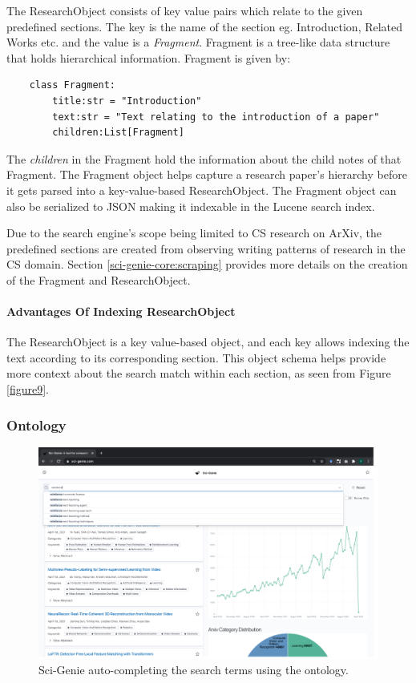 The ResearchObject consists of key value pairs which relate to the given predefined sections. The key is the name of the section eg. Introduction, Related Works etc. and the value is a \textit{Fragment}. 
Fragment is a tree-like data structure that holds hierarchical information. Fragment is given by:
\begin{verbatim}
    class Fragment:
        title:str = "Introduction"
        text:str = "Text relating to the introduction of a paper"
        children:List[Fragment] 
\end{verbatim}    

The \textit{children} in the Fragment hold the information about the child notes of that Fragment. The Fragment object helps capture a research paper’s hierarchy before it gets parsed into a key-value-based ResearchObject. The Fragment object can also be serialized to JSON making it indexable in the Lucene search index.  

Due to the search engine’s scope being limited to CS research on ArXiv, the predefined sections are created from observing writing patterns of research in the CS domain. Section \ref{sci-genie-core:scraping} provides more details on the creation of the Fragment and ResearchObject. 

\paragraph{Advantages Of Indexing ResearchObject}
The ResearchObject is a key value-based object, and each key allows indexing the text according to its corresponding section. This object schema helps provide more context about the search match within each section, as seen from Figure \ref{figure9}. 

\subsubsection{Ontology}
\begin{figure}[h]
    \centering
    \includegraphics[width=\maxwidth{\textwidth}]{src/images/sci-genie-autocomp-example.png}
    \caption{Sci-Genie auto-completing the search terms using the ontology. }
    \label{figure\arabic{figurecounter}}
\end{figure}


